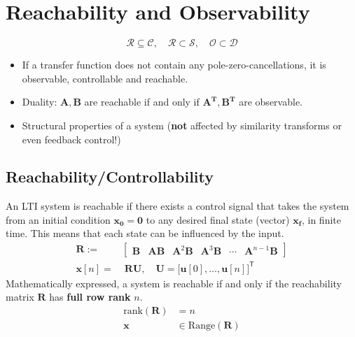 \section{Reachability and Observability}
\noindent\begin{equation*}
    \mathcal{R} \subseteq \mathcal{C}, \quad \mathcal{R} \subset\mathcal{S}, \quad \mathcal{O} \subset \mathcal{D}
\end{equation*}


\begin{itemize}
    \item If a transfer function does not contain any pole-zero-cancellations, it is observable, controllable and reachable.
    \item Duality: $\mathbf{A},\mathbf{B}$ are reachable if and only if $\mathbf{A^T}, \mathbf{B^T}$ are observable.
    \item Structural properties of a system (\textbf{not} affected by similarity transforms or even feedback control!)
\end{itemize}

\subsection{Reachability/Controllability}

An LTI system is reachable if there exists a control signal that takes the system from an initial condition $\mathbf{x_0} = \mathbf{0}$ to any desired final state (vector) $\mathbf{x_f}$, in finite time. This means that each state can be influenced by the input.
\noindent\begin{align*}
    \mathbf{R} :=   & \begin{bmatrix}
                          \mathbf{B} & \mathbf{AB} & \mathbf{A}^2\mathbf{B} & \mathbf{A}^3\mathbf{B} & \cdots & \mathbf{A}^{n-1}\mathbf{B}
                      \end{bmatrix} \\
    \mathbf{x}[n] = & \; \mathbf{RU},\quad \mathbf{U}={\bigl[\mathbf{u}[0],\ldots, \mathbf{u}[n]\bigr]}^{\mathsf{T}}
\end{align*}
Mathematically expressed, a system is reachable if and only if the reachability matrix $\mathbf{R}$ has \textbf{full row rank} $n$.
\begin{align*}
    \text{rank}(\mathbf{R}) & = n                            \\
    \mathbf{x}              & \in \mathrm{Range}(\mathbf{R})
\end{align*}

